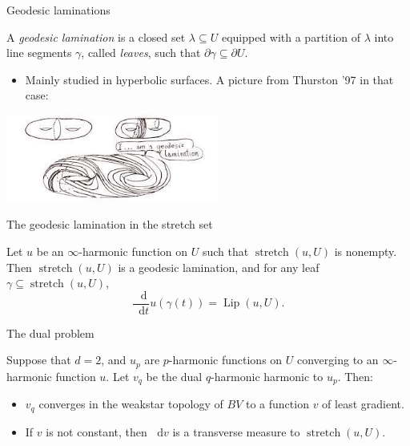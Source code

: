 \documentclass[10pt]{beamer}
\newcommand*\dif{\mathop{}\!\mathrm{d}}
\DeclareMathOperator{\Lip}{Lip}
\DeclareMathOperator{\Stretch}{stretch}
\begin{document}
\begin{frame}{Geodesic laminations}
\begin{definition}
A \emph{geodesic lamination} is a closed set $\lambda \subseteq U$ equipped with a partition of $\lambda$ into line segments $\gamma$, called \emph{leaves}, such that $\partial \gamma \subseteq \partial U$. 
\end{definition}

\begin{itemize}
\item Mainly studied in hyperbolic surfaces. A picture from Thurston '97 in that case:
\end{itemize}

\centering 
\includegraphics[width=7cm]{GeodesicLamination.jpg}
    
\end{frame}

\begin{frame}{The geodesic lamination in the stretch set}
\begin{theorem}
Let $u$ be an $\infty$-harmonic function on $U$ such that $\Stretch(u, U)$ is nonempty.
Then $\Stretch(u, U)$ is a geodesic lamination, and for any leaf $\gamma \subseteq \Stretch(u, U)$,
$$\frac{\dif}{\dif t} u(\gamma(t)) = \Lip(u, U).$$
\end{theorem}
\end{frame}

\begin{frame}{The dual problem}
\begin{theorem}
Suppose that $d = 2$, and $u_p$ are $p$-harmonic functions on $U$ converging to an $\infty$-harmonic function $u$.
Let $v_q$ be the dual $q$-harmonic harmonic to $u_p$.
Then:
\begin{itemize}
\item $v_q$ converges in the weakstar topology of $BV$ to a function $v$ of least gradient.
\item If $v$ is not constant, then $\dif v$ is a transverse measure to $\Stretch(u, U)$.
\end{itemize}
\end{theorem}
\end{frame}
\end{document}
